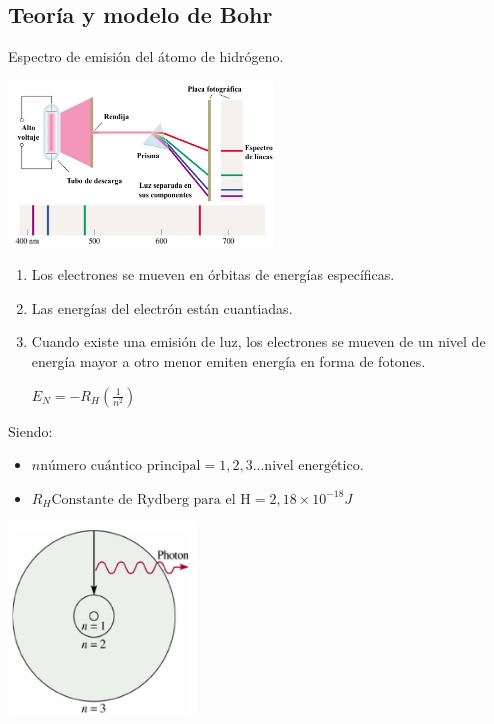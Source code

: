     \subsection{Teoría y modelo de Bohr}
        \indent Espectro de emisión del átomo de hidrógeno.
        \begin{center} \includegraphics[width=7cm]{./imagenes/espectroEmisionHidrogeno.png} \end{center}
        \begin{enumerate}
            \item Los electrones se mueven en órbitas de energías específicas.
            \item Las energías del electrón están cuantiadas.
            \item Cuando existe una emisión de luz, los electrones se mueven de un nivel de energía mayor a otro menor emiten energía en forma de fotones.
            \saltoPag%
            \begin{center} 
                $E_N = - R_H (\frac{1}{n^2})$
            \end{center}
        \end{enumerate}
        \indent Siendo:
        \begin{itemize}
            \item $n \text{número cuántico principal} = 1,2,3 ... \text{nivel energético}$.
            \item $R_H \text{Constante de Rydberg para el H} = 2,18 \times 10^{-18}J$
        \end{itemize}
        \begin{center} \includegraphics[width=5cm]{./imagenes/nivelesDeEnergia.png} \end{center}
